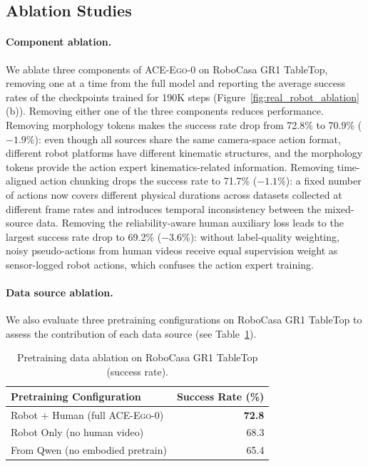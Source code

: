\documentclass{llmxive}
\providecommand{\OURS}{\textsc{ACE-Ego-0}\xspace}
\providecommand{\Ours}{\OURS}
\begin{document}
\subsection{Ablation Studies}
\label{sec:ablation_studies}

\paragraph{Component ablation.}
We ablate three components of \Ours on RoboCasa GR1 TableTop, removing one at a time from the full model and reporting the average success rates of the checkpoints trained for 190K steps (Figure~\ref{fig:real_robot_ablation}(b)).
Removing either one of the three components reduces performance.
Removing morphology tokens makes the success rate drop from 72.8\% to 70.9\% ($-1.9\%$): even though all sources share the same camera-space action format, different robot platforms have different kinematic structures, and the morphology tokens provide the action expert kinematics-related information.
Removing time-aligned action chunking drops the success rate to 71.7\% ($-1.1\%$): a fixed number of actions now covers different physical durations across datasets collected at different frame rates and introduces temporal inconsistency between the mixed-source data.
Removing the reliability-aware human auxiliary loss leads to the largest success rate drop to 69.2\% ($-3.6\%$): without label-quality weighting, noisy pseudo-actions from human videos receive equal supervision weight as sensor-logged robot actions, which confuses the action expert training.



\paragraph{Data source ablation.}
We also evaluate three pretraining configurations on RoboCasa GR1 TableTop to assess the contribution of each data source (see Table~\ref{tab:human_scaling}).

\begin{table}[!htbp]
  \centering
  \small
  \begin{tabular}{p{}r}
    \toprule
    Pretraining Configuration & Success Rate (\%) \\
    \midrule
    Robot + Human (full \Ours)          & \textbf{72.8} \\
    Robot Only (no human video)         & 68.3 \\
    From Qwen (no embodied pretrain)    & 65.4 \\
    \bottomrule
  \end{tabular}
\caption{Pretraining data ablation on RoboCasa GR1 TableTop (success rate).}
\label{tab:human_scaling}
\end{table}
\end{document}
